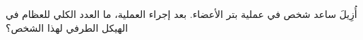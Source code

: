 
\begin{question}

\begin{instance}

\begin{mcq}[standalone=false]

\begin{stem}
أُزِيلَ ساعد شخص في عملية بتر الأعضاء. بعد إجراء العملية، ما العدد الكلي للعظام في الهيكل الطرفي لهذا الشخص؟\par

\end{stem}

\begin{distractors}
        
\end{distractors}

\end{mcq}

\end{instance}

\end{question}
